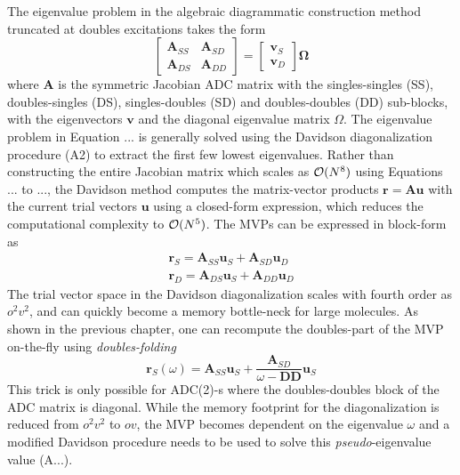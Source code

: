 The eigenvalue problem in the algebraic diagrammatic construction method truncated at doubles excitations takes the form
\begin{equation}
\begin{bmatrix}
\mathbf{A}_{SS} & \mathbf{A}_{SD} \\
\mathbf{A}_{DS} & \mathbf{A}_{DD}
\end{bmatrix} =  
\begin{bmatrix}
\mathbf{v}_{S} \\
\mathbf{v}_{D}
\end{bmatrix}
\mathbf{\Omega}
\end{equation}
\noindent where $\mathbf{A}$ is the symmetric Jacobian ADC matrix with the singles-singles (SS), doubles-singles (DS), singles-doubles (SD) and doubles-doubles (DD) sub-blocks, with the eigenvectors $\mathbf{v}$ and the diagonal eigenvalue matrix $\Omega$. The eigenvalue problem in Equation ... is generally solved using the Davidson diagonalization procedure (A2) to extract the first few lowest eigenvalues. Rather than constructing the entire Jacobian matrix which scales as $\mathcal{O}(N^{8})$ using Equations ... to ..., the Davidson method computes the matrix-vector products $\mathbf{r} = \mathbf{A} \mathbf{u}$ with the current trial vectors $\mathbf{u}$ using a closed-form expression, which reduces the computational complexity to $\mathcal{O}(N^{5})$. The MVPs can be expressed in block-form as
\begin{equation}
\begin{split}
\mathbf{r}_{S} = \mathbf{A}_{SS} \mathbf{u}_{S} + \mathbf{A}_{SD} \mathbf{u}_{D} \\
\mathbf{r}_{D} = \mathbf{A}_{DS} \mathbf{u}_{S} + \mathbf{A}_{DD} \mathbf{u}_{D}
\end{split} 
\end{equation}
\noindent The trial vector space in the Davidson diagonalization scales with fourth order as $o^2v^2$, and can quickly become a memory bottle-neck for large molecules. As shown in the previous chapter, one can recompute the doubles-part of the MVP on-the-fly using \emph{doubles-folding}
\begin{equation}
\mathbf{r}_S(\omega) = \mathbf{A}_{SS} \mathbf{u}_{S} + \frac{\mathbf{A}_{SD}}{\omega - \mathbf{DD}} \mathbf{u}_{S} 
\end{equation} 
\noindent This trick is only possible for ADC(2)-s where the doubles-doubles block of the ADC matrix is diagonal. While the memory footprint for the diagonalization is reduced from $o^2v^2$ to $ov$, the MVP becomes dependent on the eigenvalue $\omega$ and a modified Davidson procedure needs to be used to solve this \emph{pseudo}-eigenvalue value (A...). 

